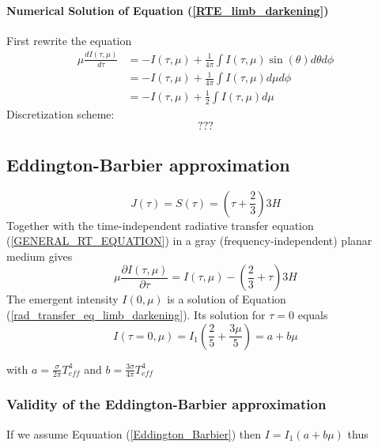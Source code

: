 \documentclass[../main/main.tex]{subfiles}
\begin{document}
\paragraph{Numerical Solution of Equation (\ref{RTE_limb_darkening})}
First rewrite the equation
\begin{equation}
\begin{aligned}
\mu \frac{dI(\tau,\mu)}{d\tau} 
&= -I(\tau,\mu)  + \frac{1}{4\pi} \int I(\tau,\mu) \sin(\theta) d\theta d\phi 
\\ &= -I(\tau,\mu)  + \frac{1}{4\pi} \int I(\tau,\mu) d\mu d\phi 
\\ &= -I(\tau,\mu)  + \frac{1}{2} \int I(\tau,\mu) d\mu 
\end{aligned}
\end{equation}
Discretization scheme:
\begin{equation}
???
\end{equation}


\subsection{Eddington-Barbier approximation} 
\begin{equation}
J(\tau) = S(\tau) = \left( \tau + \frac{2}{3} \right) 3H
\label{Eddington_Barbier}
\end{equation}
Together with the time-independent radiative transfer equation (\ref{GENERAL_RT_EQUATION}) in a gray (frequency-independent) planar medium gives \begin{equation}
\mu \frac{\partial I(\tau,\mu)}{\partial \tau} = I(\tau,\mu) - \left(\frac{2}{3}+\tau \right) 3H
\label{rad_transfer_eq_limb_darkening}
\end{equation}
The emergent intensity $I(0,\mu)$ is a solution of Equation (\ref{rad_transfer_eq_limb_darkening}). Its solution for $\tau = 0$ equals 
\begin{equation}
\boxed{I(\tau = 0,\mu) = I_1 \left( \frac{2}{5} + \frac{3 \mu}{5} \right)  = a+b\mu }
\end{equation}

with $a= \frac{\sigma}{2 \pi}T_{eff}^4$ and $b = \frac{3 \sigma}{4 \pi}T_{eff}^4$

\subsubsection{Validity of the Eddington-Barbier approximation}
\label{validity_eddington}

If we assume Equuation (\ref{Eddington_Barbier}) then $I = I_1(a+b\mu)$ thus 
\end{document}
